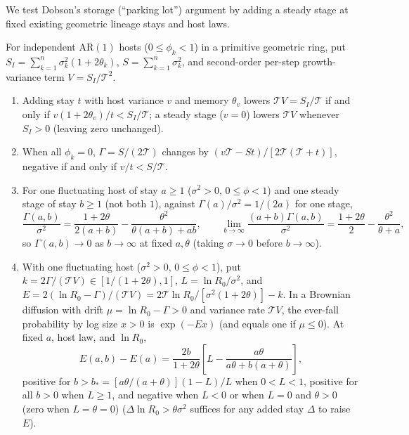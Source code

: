 We test Dobson's storage (``parking lot'') argument \citep{dobson2020} by adding a steady stage at fixed existing geometric lineage stays and host laws.

\begin{proposition}\label{prop:ring-steady}
For independent $\mathrm{AR}(1)$ hosts ($0 \le \phi_k < 1$) in a primitive geometric ring, put $S_I = \sum_{k=1}^n \sigma_k^2(1 + 2\theta_k)$, $S = \sum_{k=1}^n \sigma_k^2$, and second-order per-step growth-variance term $V = S_I / \mathcal{T}^2$.
\begin{enumerate}
\item[(a)] Adding stay $t$ with host variance $v$ and memory $\theta_v$ lowers $\mathcal{T}V = S_I / \mathcal{T}$ if and only if $v(1 + 2\theta_v)/t < S_I / \mathcal{T}$; a steady stage ($v = 0$) lowers $\mathcal{T}V$ whenever $S_I > 0$ (leaving zero unchanged).
\item[(b)] When all $\phi_k = 0$, $\Gamma = S/(2\mathcal{T})$ changes by $(v\mathcal{T} - St)/[2\mathcal{T}(\mathcal{T} + t)]$, negative if and only if $v/t < S/\mathcal{T}$.
\item[(c)] For one fluctuating host of stay $a \ge 1$ ($\sigma^2 > 0$, $0 \le \phi < 1$) and one steady stage of stay $b \ge 1$ (not both $1$), against $\Gamma(a)/\sigma^2 = 1/(2a)$ for one stage,
\begin{equation}
\frac{\Gamma(a,b)}{\sigma^2} = \frac{1 + 2\theta}{2(a + b)} - \frac{\theta^2}{\theta(a + b) + ab}, \qquad \lim_{b \to \infty} \frac{(a + b)\Gamma(a,b)}{\sigma^2} = \frac{1 + 2\theta}{2} - \frac{\theta^2}{\theta + a},
\label{eq:ring-steady}
\end{equation}
so $\Gamma(a,b) \to 0$ as $b \to \infty$ at fixed $a, \theta$ (taking $\sigma \to 0$ before $b \to \infty$).
\item[(d)] With one fluctuating host ($\sigma^2 > 0$, $0 \le \phi < 1$), put $k = 2\Gamma/(\mathcal{T}V) \in [1/(1 + 2\theta), 1]$, $L = \ln R_0 / \sigma^2$, and $E = 2(\ln R_0 - \Gamma)/(\mathcal{T}V) = 2\mathcal{T}\ln R_0 / [\sigma^2(1 + 2\theta)] - k$. In a Brownian diffusion with drift $\mu = \ln R_0 - \Gamma > 0$ and variance rate $\mathcal{T}V$, the ever-fall probability by log size $x > 0$ is $\exp(-Ex)$ (and equals one if $\mu \le 0$). At fixed $a$, host law, and $\ln R_0$,
\begin{equation}
E(a,b) - E(a) = \frac{2b}{1 + 2\theta}\left[ L - \frac{a\theta}{a\theta + b(a + \theta)} \right],
\label{eq:ring-index-diff}
\end{equation}
positive for $b > b_* = [a\theta/(a + \theta)](1 - L)/L$ when $0 < L < 1$, positive for all $b > 0$ when $L \ge 1$, and negative when $L<0$ or when $L=0$ and $\theta>0$ (zero when $L=\theta=0$) ($\Delta\ln R_0 > \theta\sigma^2$ suffices for any added stay $\Delta$ to raise $E$).
\end{enumerate}
\end{proposition}


